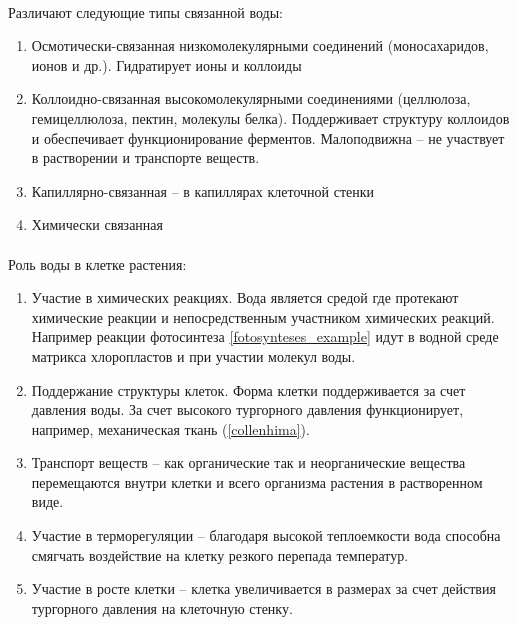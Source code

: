 
\paragraph*{}Различают следующие типы связанной воды:

\begin{enumerate}
	\item Осмотически-связанная низкомолекулярными соединений (моносахаридов, ионов и др.). Гидратирует ионы и коллоиды
	\item Коллоидно-связанная высокомолекулярными соединениями (целлюлоза, гемицеллюлоза, пектин, молекулы белка). Поддерживает структуру коллоидов и обеспечивает функционирование ферментов. Малоподвижна -- не участвует в растворении и транспорте веществ.
	\item Капиллярно-связанная -- в капиллярах клеточной стенки
	\item Химически связанная
\end{enumerate}

\paragraph*{}Роль воды в клетке растения:

\begin{enumerate}

   \item Участие в химических реакциях. Вода является средой где протекают химические реакции и непосредственным участником химических реакций. Например реакции фотосинтеза \ref{fotosynteses_example} идут в водной среде матрикса хлоропластов и при участии молекул воды.
   \item Поддержание структуры клеток. Форма клетки поддерживается за счет  давления воды. За счет высокого тургорного давления функционирует, например, механическая ткань  (\ris \ref{collenhima}).
   \item Транспорт веществ -- как органические так и неорганические вещества перемещаются внутри клетки и всего организма растения в растворенном виде.
   \item Участие в терморегуляции -- благодаря высокой теплоемкости вода способна смягчать воздействие на клетку резкого перепада температур.
   \item Участие в росте клетки -- клетка увеличивается в размерах за счет действия тургорного давления на клеточную стенку.

\end{enumerate}

